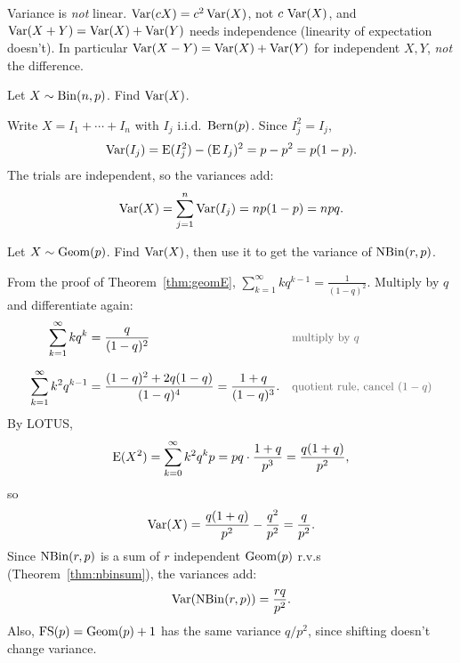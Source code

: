 \bigskip

\begin{pitfall}
Variance is \emph{not} linear. $\operatorname{Var}(cX) = c^{2}\operatorname{Var}(X)$, not $c\,\operatorname{Var}(X)$, and $\operatorname{Var}(X + Y) = \operatorname{Var}(X) + \operatorname{Var}(Y)$ needs independence (linearity of expectation doesn't). In particular $\operatorname{Var}(X - Y) = \operatorname{Var}(X) + \operatorname{Var}(Y)$ for independent $X, Y$, \emph{not} the difference.
\end{pitfall}

\bigskip

\begin{example}\label{ex:binvar}
Let $X \sim \operatorname{Bin}(n, p)$. Find $\operatorname{Var}(X)$.
\end{example}

\medskip

\begin{solution}
Write $X = I_1 + \cdots + I_n$ with $I_j$ i.i.d.\ $\operatorname{Bern}(p)$. Since $I_j^{2} = I_j$,
\medskip
\[
\operatorname{Var}(I_j) = \operatorname{E}(I_j^{2}) - (\operatorname{E} I_j)^{2} = p - p^{2} = p(1 - p).
\]
\medskip
The trials are independent, so the variances add:
\medskip
\[
\operatorname{Var}(X) = \sum_{j=1}^{n} \operatorname{Var}(I_j) = np(1 - p) = npq.
\]
\end{solution}

\bigskip

\begin{example}\label{ex:geomvar}
Let $X \sim \operatorname{Geom}(p)$. Find $\operatorname{Var}(X)$, then use it to get the variance of $\operatorname{NBin}(r, p)$.
\end{example}

\medskip

\begin{solution}
From the proof of Theorem~\ref{thm:geomE}, $\sum_{k=1}^{\infty} k q^{k-1} = \frac{1}{(1-q)^{2}}$. Multiply by $q$ and differentiate again:
\medskip
\begin{align*}
\sum_{k=1}^{\infty} k q^{k} &= \frac{q}{(1 - q)^{2}}
  && \by{multiply by $q$} \\[0.6em]
\sum_{k=1}^{\infty} k^{2} q^{k-1} &= \frac{(1 - q)^{2} + 2q(1 - q)}{(1 - q)^{4}}
  = \frac{1 + q}{(1 - q)^{3}}.
  && \by{quotient rule, cancel $(1-q)$}
\end{align*}
\medskip
By LOTUS,
\medskip
\[
\operatorname{E}(X^{2}) = \sum_{k=0}^{\infty} k^{2} q^{k} p = pq \cdot \frac{1 + q}{p^{3}} = \frac{q(1 + q)}{p^{2}},
\]
\medskip
so
\medskip
\[
\operatorname{Var}(X) = \frac{q(1 + q)}{p^{2}} - \frac{q^{2}}{p^{2}} = \frac{q}{p^{2}}.
\]
\medskip
Since $\operatorname{NBin}(r, p)$ is a sum of $r$ independent $\operatorname{Geom}(p)$ r.v.s (Theorem~\ref{thm:nbinsum}), the variances add:
\medskip
\[
\operatorname{Var}(\operatorname{NBin}(r, p)) = \frac{rq}{p^{2}}.
\]
\medskip
Also, $\operatorname{FS}(p) = \operatorname{Geom}(p) + 1$ has the same variance $q/p^{2}$, since shifting doesn't change variance.
\end{solution}

